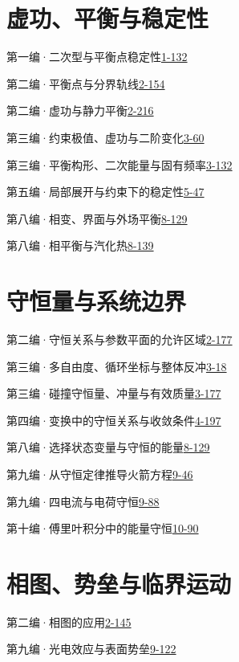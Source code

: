 \section*{虚功、平衡与稳定性}
\noindent 第一编·二次型与平衡点稳定性\quad\href{course-page:1:137}{1-132}\par
\noindent 第二编·平衡点与分界轨线\quad\href{course-page:2:156}{2-154}\par
\noindent 第二编·虚功与静力平衡\quad\href{course-page:2:218}{2-216}\par
\noindent 第三编·约束极值、虚功与二阶变化\quad\href{course-page:3:63}{3-60}\par
\noindent 第三编·平衡构形、二次能量与固有频率\quad\href{course-page:3:135}{3-132}\par
\noindent 第五编·局部展开与约束下的稳定性\quad\href{course-page:5:49}{5-47}\par
\noindent 第八编·相变、界面与外场平衡\quad\href{course-page:8:132}{8-129}\par
\noindent 第八编·相平衡与汽化热\quad\href{course-page:8:142}{8-139}\par
\section*{守恒量与系统边界}
\noindent 第二编·守恒关系与参数平面的允许区域\quad\href{course-page:2:179}{2-177}\par
\noindent 第三编·多自由度、循环坐标与整体反冲\quad\href{course-page:3:21}{3-18}\par
\noindent 第三编·碰撞守恒量、冲量与有效质量\quad\href{course-page:3:180}{3-177}\par
\noindent 第四编·变换中的守恒关系与收敛条件\quad\href{course-page:4:199}{4-197}\par
\noindent 第八编·选择状态变量与守恒的能量\quad\href{course-page:8:132}{8-129}\par
\noindent 第九编·从守恒定律推导火箭方程\quad\href{course-page:9:50}{9-46}\par
\noindent 第九编·四电流与电荷守恒\quad\href{course-page:9:92}{9-88}\par
\noindent 第十编·傅里叶积分中的能量守恒\quad\href{course-page:10:94}{10-90}\par
\section*{相图、势垒与临界运动}
\noindent 第二编·相图的应用\quad\href{course-page:2:147}{2-145}\par
\noindent 第九编·光电效应与表面势垒\quad\href{course-page:9:126}{9-122}\par
